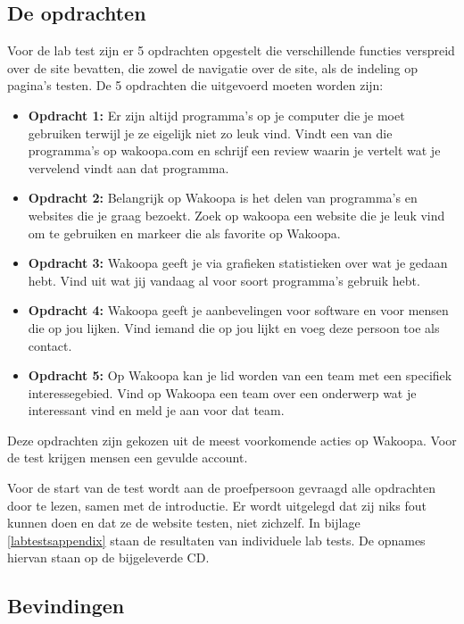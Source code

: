 \documentclass[a4paper, 10pt, pdftex]{report}
\begin{document}
    \subsection{De opdrachten}
    Voor de lab test zijn er 5 opdrachten opgestelt die verschillende functies verspreid over de site bevatten, die zowel de navigatie over de site, als de indeling op pagina's testen. De 5 opdrachten die uitgevoerd moeten worden zijn:

    \begin{itemize}
      \item \textbf{Opdracht 1:}
      Er zijn altijd programma's op je computer die je moet gebruiken terwijl je ze eigelijk niet zo leuk vind. Vindt een van die programma's op wakoopa.com en schrijf een review waarin je vertelt wat je vervelend vindt aan dat programma.

      \item \textbf{Opdracht 2:}
      Belangrijk op Wakoopa is het delen van programma's en websites die je graag bezoekt. Zoek op wakoopa een website die je leuk vind om te gebruiken en markeer die als favorite op Wakoopa.

      \item \textbf{Opdracht 3:}
      Wakoopa geeft je via grafieken statistieken over wat je gedaan hebt. Vind uit wat jij vandaag al voor soort programma's gebruik hebt.

      \item \textbf{Opdracht 4:}
      Wakoopa geeft je aanbevelingen voor software en voor mensen die op jou lijken. Vind iemand die op jou lijkt en voeg deze persoon toe als contact.

      \item \textbf{Opdracht 5:}
      Op Wakoopa kan je lid worden van een team met een specifiek interessegebied. Vind op Wakoopa een team over een onderwerp wat je interessant vind en meld je aan voor dat team.
    \end{itemize}
    Deze opdrachten zijn gekozen uit de meest voorkomende acties op Wakoopa. Voor de test krijgen mensen een gevulde account.

    Voor de start van de test wordt aan de proefpersoon gevraagd alle opdrachten door te lezen, samen met de introductie. Er wordt uitgelegd dat zij niks fout kunnen doen en dat ze de website testen, niet zichzelf. In bijlage \ref{labtestsappendix} staan de resultaten van individuele lab tests. De opnames hiervan staan op de bijgeleverde CD.

    \subsection{Bevindingen}
\end{document}
